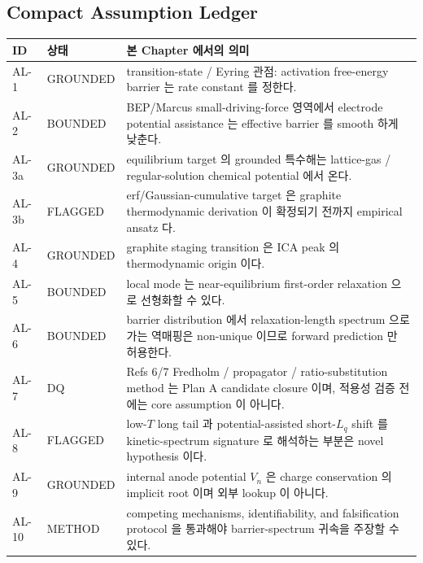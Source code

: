 \documentclass[11pt,a4paper]{article}
\begin{document}
\subsection{Compact Assumption Ledger}\label{sec:assumption_ledger}
\begin{longtable}{p{} p{} p{}}
\toprule ID & 상태 & 본 Chapter 에서의 의미 \\ \midrule \endhead
AL-1 & GROUNDED & transition-state / Eyring 관점: activation free-energy barrier 는 rate constant 를 정한다. \\
AL-2 & BOUNDED & BEP/Marcus small-driving-force 영역에서 electrode potential assistance 는 effective barrier 를 smooth 하게 낮춘다. \\
AL-3a & GROUNDED & equilibrium target 의 grounded 특수해는 lattice-gas / regular-solution chemical potential 에서 온다. \\
AL-3b & FLAGGED & erf/Gaussian-cumulative target 은 graphite thermodynamic derivation 이 확정되기 전까지 empirical ansatz 다. \\
AL-4 & GROUNDED & graphite staging transition 은 ICA peak 의 thermodynamic origin 이다. \\
AL-5 & BOUNDED & local mode 는 near-equilibrium first-order relaxation 으로 선형화할 수 있다. \\
AL-6 & BOUNDED & barrier distribution 에서 relaxation-length spectrum 으로 가는 역매핑은 non-unique 이므로 forward prediction 만 허용한다. \\
AL-7 & DQ & Refs 6/7 Fredholm / propagator / ratio-substitution method 는 Plan A candidate closure 이며, 적용성 검증 전에는 core assumption 이 아니다. \\
AL-8 & FLAGGED & low-$T$ long tail 과 potential-assisted short-$L_q$ shift 를 kinetic-spectrum signature 로 해석하는 부분은 novel hypothesis 이다. \\
AL-9 & GROUNDED & internal anode potential $V_n$ 은 charge conservation 의 implicit root 이며 외부 lookup 이 아니다. \\
AL-10 & METHOD & competing mechanisms, identifiability, and falsification protocol 을 통과해야 barrier-spectrum 귀속을 주장할 수 있다. \\
\bottomrule
\end{longtable}

\end{document}
